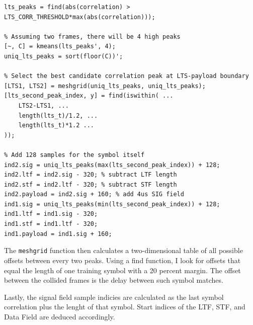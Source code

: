 \begin{lstlisting}[captionpos=b,caption={Collision Offset Detection using meshgrid},label=lst:meshgrid]
% Find peaks above a parametrized threshold
lts_peaks = find(abs(correlation) > LTS_CORR_THRESHOLD*max(abs(correlation)));

% Assuming two frames, there will be 4 high peaks
[~, C] = kmeans(lts_peaks', 4);
uniq_lts_peaks = sort(floor(C))';

% Select the best candidate correlation peak at LTS-payload boundary
[LTS1, LTS2] = meshgrid(uniq_lts_peaks, uniq_lts_peaks);
[lts_second_peak_index, y] = find(iswithin( ...
    LTS2-LTS1, ...
    length(lts_t)/1.2, ...
    length(lts_t)*1.2 ...
));

% Add 128 samples for the symbol itself
ind2.sig = uniq_lts_peaks(max(lts_second_peak_index)) + 128;
ind2.ltf = ind2.sig - 320; % subtract LTF length
ind2.stf = ind2.ltf - 320; % subtract STF length
ind2.payload = ind2.sig + 160; % add 4us SIG field
ind1.sig = uniq_lts_peaks(min(lts_second_peak_index)) + 128;
ind1.ltf = ind1.sig - 320;
ind1.stf = ind1.ltf - 320;
ind1.payload = ind1.sig + 160;
\end{lstlisting}

The \texttt{meshgrid} function then calculates a two-dimensional table of all possible offsets between every two peaks. Using a find function, I look for offsets that equal the length of one training symbol with a 20 percent margin.  The offset between the collided frames is the delay between such symbol matches.

Lastly, the signal field sample indicies are calculated as the last symbol correlation plus the lenght of that symbol. Start indices of the \gls{LTF}, \gls{STF}, and Data Field are deduced accordingly.
